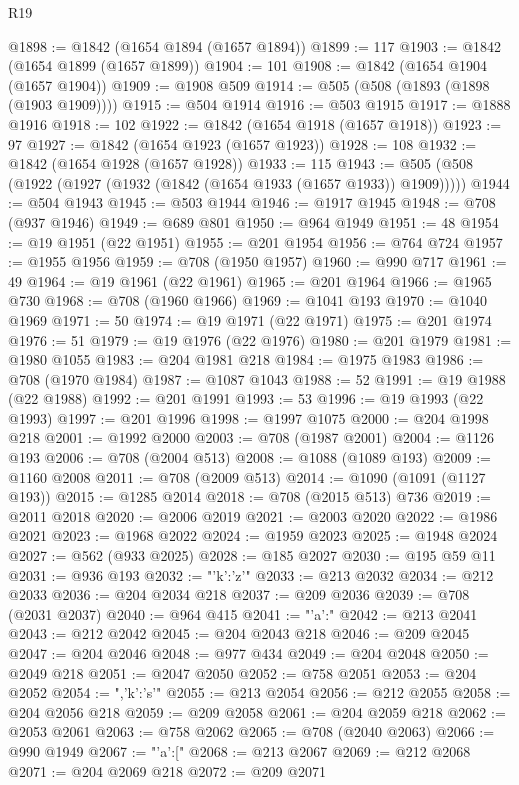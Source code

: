 \begin{lexlean}{R19}
\begin{coremodule}
{{{{{{@1898 := @1842 (@1654 @1894 (@1657 @1894))
@1899 := 117
@1903 := @1842 (@1654 @1899 (@1657 @1899))
@1904 := 101
@1908 := @1842 (@1654 @1904 (@1657 @1904))
@1909 := @1908 @509
@1914 := @505 (@508 (@1893 (@1898 (@1903 @1909))))
@1915 := @504 @1914
@1916 := @503 @1915
@1917 := @1888 @1916
@1918 := 102
@1922 := @1842 (@1654 @1918 (@1657 @1918))
@1923 := 97
@1927 := @1842 (@1654 @1923 (@1657 @1923))
@1928 := 108
@1932 := @1842 (@1654 @1928 (@1657 @1928))
@1933 := 115
@1943 := @505 (@508 (@1922 (@1927 (@1932 (@1842 (@1654 @1933 (@1657 @1933)) @1909)))))
@1944 := @504 @1943
@1945 := @503 @1944
@1946 := @1917 @1945
@1948 := @708 (@937 @1946)
@1949 := @689 @801
@1950 := @964 @1949
@1951 := 48
@1954 := @19 @1951 (@22 @1951)
@1955 := @201 @1954
@1956 := @764 @724
@1957 := @1955 @1956
@1959 := @708 (@1950 @1957)
@1960 := @990 @717
@1961 := 49
@1964 := @19 @1961 (@22 @1961)
@1965 := @201 @1964
@1966 := @1965 @730
@1968 := @708 (@1960 @1966)
@1969 := @1041 @193
@1970 := @1040 @1969
@1971 := 50
@1974 := @19 @1971 (@22 @1971)
@1975 := @201 @1974
@1976 := 51
@1979 := @19 @1976 (@22 @1976)
@1980 := @201 @1979
@1981 := @1980 @1055
@1983 := @204 @1981 @218
@1984 := @1975 @1983
@1986 := @708 (@1970 @1984)
@1987 := @1087 @1043
@1988 := 52
@1991 := @19 @1988 (@22 @1988)
@1992 := @201 @1991
@1993 := 53
@1996 := @19 @1993 (@22 @1993)
@1997 := @201 @1996
@1998 := @1997 @1075
@2000 := @204 @1998 @218
@2001 := @1992 @2000
@2003 := @708 (@1987 @2001)
@2004 := @1126 @193
@2006 := @708 (@2004 @513)
@2008 := @1088 (@1089 @193)
@2009 := @1160 @2008
@2011 := @708 (@2009 @513)
@2014 := @1090 (@1091 (@1127 @193))
@2015 := @1285 @2014
@2018 := @708 (@2015 @513) @736
@2019 := @2011 @2018
@2020 := @2006 @2019
@2021 := @2003 @2020
@2022 := @1986 @2021
@2023 := @1968 @2022
@2024 := @1959 @2023
@2025 := @1948 @2024
@2027 := @562 (@933 @2025)
@2028 := @185 @2027
@2030 := @195 @59 @11
@2031 := @936 @193
@2032 := "{'k':'z'}"
@2033 := @213 @2032
@2034 := @212 @2033
@2036 := @204 @2034 @218
@2037 := @209 @2036
@2039 := @708 (@2031 @2037)
@2040 := @964 @415
@2041 := "{'a':"
@2042 := @213 @2041
@2043 := @212 @2042
@2045 := @204 @2043 @218
@2046 := @209 @2045
@2047 := @204 @2046
@2048 := @977 @434
@2049 := @204 @2048
@2050 := @2049 @218
@2051 := @2047 @2050
@2052 := @758 @2051
@2053 := @204 @2052
@2054 := ",'k':'s'}"
@2055 := @213 @2054
@2056 := @212 @2055
@2058 := @204 @2056 @218
@2059 := @209 @2058
@2061 := @204 @2059 @218
@2062 := @2053 @2061
@2063 := @758 @2062
@2065 := @708 (@2040 @2063)
@2066 := @990 @1949
@2067 := "{'a':["
@2068 := @213 @2067
@2069 := @212 @2068
@2071 := @204 @2069 @218
@2072 := @209 @2071
}}}}}}}
\end{coremodule}
\end{lexlean}

